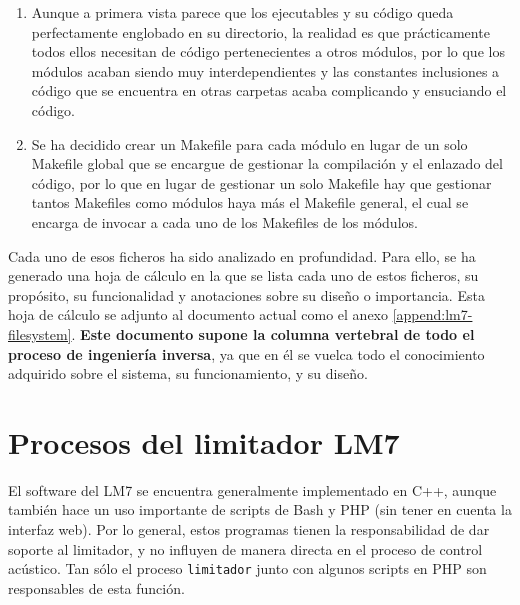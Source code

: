 \begin{enumerate}
    \item Aunque a primera vista parece que los ejecutables y su código queda perfectamente englobado en su directorio, la realidad es que prácticamente todos ellos necesitan de código pertenecientes a otros módulos, por lo que los módulos acaban siendo muy interdependientes y las constantes inclusiones a código que se encuentra en otras carpetas acaba complicando y ensuciando el código.

    \item Se ha decidido crear un Makefile para cada módulo en lugar de un solo Makefile global que se encargue de gestionar la compilación y el enlazado del código, por lo que en lugar de gestionar un solo Makefile hay que gestionar tantos Makefiles como módulos haya más el Makefile general, el cual se encarga de invocar a cada uno de los Makefiles de los módulos.
\end{enumerate}

Cada uno de esos ficheros ha sido analizado en profundidad. Para ello, se ha generado una hoja de cálculo en la que se lista cada uno de estos ficheros, su propósito, su funcionalidad y anotaciones sobre su diseño o importancia. Esta hoja de cálculo se adjunto al documento actual como el anexo \ref{append:lm7-filesystem}. \textbf{Este documento supone la columna vertebral de todo el proceso de ingeniería inversa}, ya que en él se vuelca todo el conocimiento adquirido sobre el sistema, su funcionamiento, y su diseño.

\section{Procesos del limitador LM7} \label{sec:lm7-procesos}

El software del LM7 se encuentra generalmente implementado en C++, aunque también hace un uso importante de scripts de Bash y PHP (sin tener en cuenta la interfaz web). Por lo general, estos programas tienen la responsabilidad de dar soporte al limitador, y no influyen de manera directa en el proceso de control acústico. Tan sólo el proceso \verb|limitador| junto con algunos scripts en PHP son responsables de esta función.

